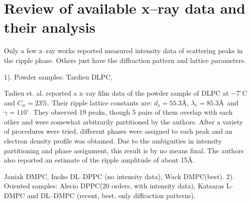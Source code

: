 \section{Review of available x--ray data and their analysis}

Only a few x--ray works \cite{Tar73,JanSS79,Ale85,Wac89a} reported
measured intensity data of scattering peaks in the ripple phase. Others
\cite{Ino80,Kat95} just have the diffraction pattern and lattice parameters.

1). Powder samples: Tardieu DLPC, 

Tadieu et. al. \cite{Tar73} reported a x--ray film data of the powder sample
of DLPC at $-7^{\circ}$C and $C_w = 23\%$. Their ripple lattice constants
are: $d_s=55.3$\AA, $\lambda_r = 85.3$\AA\ and $\gamma = 110^{\circ}$.
They observed 19 peaks, though 5 pairs of them overlap with each other
and were somewhat arbitrarily partitioned by the authors. After a variety
of procedures were tried, different phases were assigned to each peak
and an electron density profile was obtained. Due to the ambiguities in
intensity partitioning and phase assignment, this result is by no means
final. The authors also reported an estimate of the ripple amplitude
of about 15\AA.

Janiak DMPC, Inoko DL--DPPC (no intensity data), Wack DMPC(best). 2). Oriented
samples: Alecio DPPC(20 orders, with intensity data), Katsaras L-DMPC and
DL--DMPC (recent, best, only diffraction patterns).

